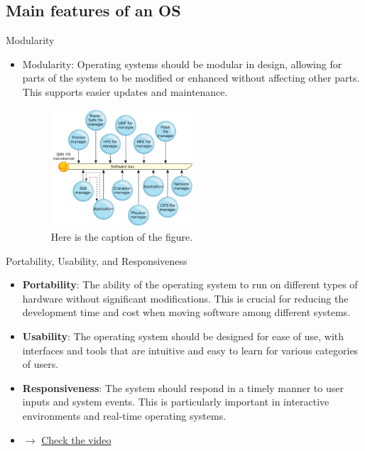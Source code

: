 \documentclass[10pt]{beamer}
\begin{document}
    \subsection{Main features of an OS}
    \begin{frame}{Modularity}
      \begin{itemize}
        \item Modularity: Operating systems should be modular in design, allowing for parts of the system to be modified or enhanced without affecting other parts. This supports easier updates and maintenance.
        \begin{figure}[h]
          \centering
          \includegraphics[width=0.5\textwidth]{figures/qnxOSExample.png}
          \caption{Here is the caption of the figure.}
          \label{fig:my_label}
          \end{figure}
      \end{itemize}
    \end{frame}
    \begin{frame}{Portability, Usability, and Responsiveness}
      \begin{itemize}
      \item \textbf{Portability}: The ability of the operating system to run on different types of hardware without significant modifications. This is crucial for reducing the development time and cost when moving software among different systems.
      \item \textbf{Usability}: The operating system should be designed for ease of use, with interfaces and tools that are intuitive and easy to learn for various categories of users.
      \item \textbf{Responsiveness}: The system should respond in a timely manner to user inputs and system events. This is particularly important in interactive environments and real-time operating systems.
      \item $\rightarrow$ \href{https://www.youtube.com/watch?v=R_FoFbAyVQk\#t=10s}{Check the video}
    \end{itemize}
    \end{frame}
\end{document}
